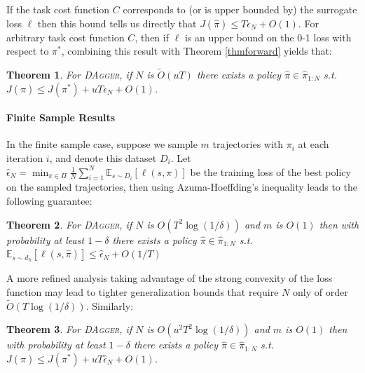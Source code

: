 \documentclass[twoside]{article}
\newtheorem{theorem}{Theorem}[section]
\begin{document}
If the task cost function $C$ corresponds to (or is upper bounded by) the surrogate loss $\ell$ then this bound tells us directly that $J(\hat{\pi}) \leq T \epsilon_N + O(1)$. For arbitrary task cost function $C$, then if $\ell$ is an upper bound on the 0-1 loss with respect to $\pi^*$, combining this result with Theorem \ref{thmforward} yields that:
\begin{theorem}\label{thmDaggerCost}
For \textsc{DAgger}, if $N$ is $\tilde{O}(uT)$ there exists a policy $\hat{\pi} \in \hat{\pi}_{1:N}$ s.t. $J(\hat{\pi}) \leq J(\pi^*) + uT\epsilon_N + O(1)$.
\end{theorem}

\paragraph{Finite Sample Results}
%
In the finite sample case, suppose we sample $m$ trajectories with $\pi_i$ at each iteration $i$, and denote this dataset $D_i$. Let $\hat{\epsilon}_N = \min_{\pi \in \Pi} \frac{1}{N} \sum_{i=1}^N \mathbb{E}_{s \sim D_i}[ \ell(s,\pi) ]$ be the training loss of the best policy on the sampled trajectories, then using Azuma-Hoeffding's inequality leads to the following guarantee:
%
\begin{theorem}\label{thmDaggerGen}
For \textsc{DAgger}, if $N$ is $O(T^2\log(1/\delta))$ and $m$ is $O(1)$ then with probability at least $1-\delta$ there exists a policy $\hat{\pi} \in \hat{\pi}_{1:N}$ s.t. $\mathbb{E}_{s \sim d_{\hat{\pi}}}[ \ell(s,\hat{\pi}) ] \leq \hat{\epsilon}_N + O(1/T)$
\end{theorem}
A more refined analysis taking advantage of the strong convexity of the loss function \citep{Kakade09} may lead to tighter generalization bounds that require $N$ only of order $\tilde{O}(T\log(1/\delta))$. Similarly:
%
\begin{theorem}\label{thmDaggerGenCost}
For \textsc{DAgger}, if $N$ is $O(u^2T^2\log(1/\delta))$ and $m$ is $O(1)$ then with probability at least $1-\delta$ there exists a policy $\hat{\pi} \in \hat{\pi}_{1:N}$ s.t. $J(\hat{\pi}) \leq J(\pi^*) + uT\hat{\epsilon}_N + O(1)$.
\end{theorem}
%
%
\end{document}
